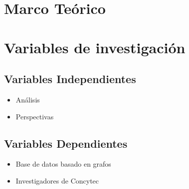 \section{Marco Teórico}

\section{Variables de investigación}
\subsection{Variables Independientes}
\begin{itemize}
    \item Análisis
    \item Perspectivas
\end{itemize}
\subsection{Variables Dependientes}
\begin{itemize}
    \item Base de datos basado en grafos
    \item Investigadores de Concytec
\end{itemize}

